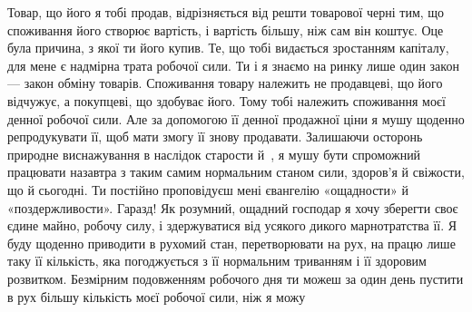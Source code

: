 Товар, що його я тобі продав, відрізняється від решти товарової
черні тим, що споживання його створює вартість, і вартість
більшу, ніж сам він коштує. Оце була причина, з якої ти його
купив. Те, що тобі видається зростанням капіталу, для мене є
надмірна трата робочої сили. Ти і я знаємо на ринку лише один
закон — закон обміну товарів. Споживання товару належить
не продавцеві, що його відчужує, а покупцеві, що здобуває його.
Тому тобі належить споживання моєї денної робочої сили. Але
за допомогою її денної продажної ціни я мушу щоденно репродукувати
її, щоб мати змогу її знову продавати. Залишаючи осторонь
природне виснажування в наслідок старости й~, я мушу
бути спроможний працювати назавтра з таким самим нормальним
станом сили, здоров’я й свіжости, що й сьогодні. Ти постійно
проповідуєш мені євангелію «ощадности» й «поздержливости».
Гаразд! Як розумний, ощадний господар я хочу зберегти своє
єдине майно, робочу силу, і здержуватися від усякого дикого
марнотратства її. Я буду щоденно приводити в рухомий стан,
перетворювати на рух, на працю лише таку її кількість, яка
погоджується з її нормальним триванням і її здоровим розвитком.
Безмірним подовженням робочого дня ти можеш за один день
пустити в рух більшу кількість моєї робочої сили, ніж я можу
\parbreak{}  %
